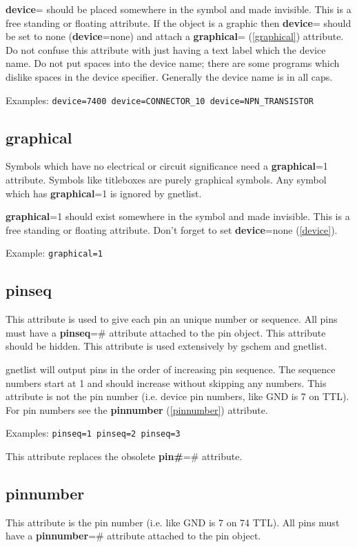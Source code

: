 \documentclass{article}
\begin{document}
{\bf device}= should be placed somewhere in the symbol and made invisible.
This is a free standing or floating attribute.  If the object is a graphic
then {\bf device}= should be set to none ({\bf device}=none) and attach
a {\bf graphical}= (\ref{graphical}) attribute.  Do not confuse this
attribute with just having a text label which the device name.  Do not
put spaces into the device name; there are some programs which dislike
spaces in the device specifier.  Generally the device name is in all caps.

Examples: \texttt{device=7400 device=CONNECTOR\_10 device=NPN\_TRANSISTOR}


\subsection{\bf graphical\label{graphical}}
Symbols which have no electrical or circuit significance need a 
{\bf graphical}=1 attribute.  Symbols like titleboxes are purely
graphical symbols.  Any symbol which has {\bf graphical}=1 is ignored
by gnetlist.

{\bf graphical}=1 should exist somewhere in the symbol and made invisible.
This is a free standing or floating attribute.  Don't forget to set 
{\bf device}=none (\ref{device}).

Example: \texttt{graphical=1}


\subsection{\bf pinseq\label{pinseq}}
This attribute is used to give each pin an unique number or sequence.
All pins must have a {\bf pinseq}=\# attribute attached to the pin object.
This attribute should be hidden.  This attribute is used extensively by
gschem and gnetlist.

gnetlist will output pins in the order of increasing pin sequence.
The sequence numbers start at 1 and should increase without skipping
any numbers.  This attribute is not the pin number (i.e. device pin
numbers, like GND is 7 on TTL).  For pin numbers see the {\bf pinnumber} (\ref{pinnumber}) attribute.  

Examples: \texttt{pinseq=1 pinseq=2 pinseq=3}

This attribute replaces the obsolete {\bf pin\#}=\# attribute.


\subsection{\bf pinnumber\label{pinnumber}}
This attribute is the pin number (i.e. like GND is 7 on 74 TTL).  
All pins must have a {\bf pinnumber}=\# attribute attached to the pin object.
\end{document}
